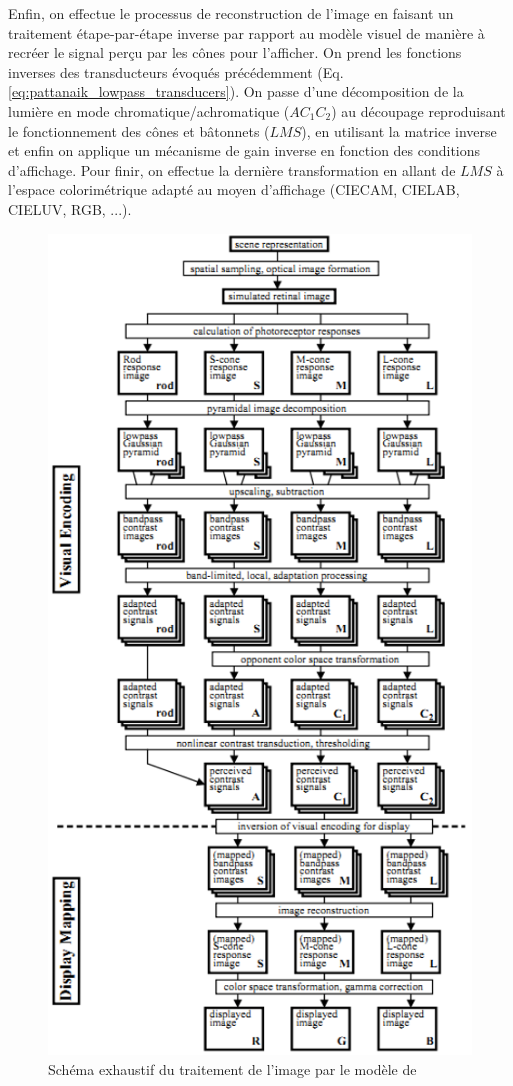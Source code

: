 	\par Enfin, on effectue le processus de reconstruction de l'image en faisant un traitement étape-par-étape inverse par rapport au modèle visuel de manière à recréer le signal perçu par les cônes pour l'afficher. On prend les fonctions inverses des transducteurs évoqués précédemment (Eq. \ref{eq:pattanaik_lowpass_transducers}). On passe d'une décomposition de la lumière en mode chromatique/achromatique ($AC_1C_2$) au découpage reproduisant le fonctionnement des cônes et bâtonnets ($LMS$), en utilisant la matrice inverse et enfin on applique un mécanisme de gain inverse en fonction des conditions d'affichage. Pour finir, on effectue la dernière transformation en allant de $LMS$ à l'espace colorimétrique adapté au moyen d'affichage (CIECAM, CIELAB, CIELUV, RGB, ...).
	
	\begin{figure}
		\centering
		\includegraphics[scale=1.25]{Figures/PattanaikFullModel}
		\caption{Schéma exhaustif du traitement de l'image par le modèle de \citep{pattanaik_multiscale_1998}}
		\label{fig:full_model_pattanaik}
	\end{figure}
	

